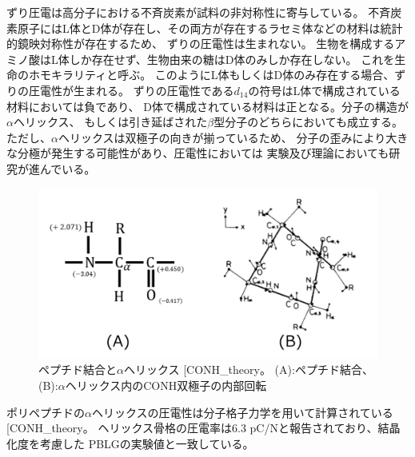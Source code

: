 \documentclass[dvipdfmx,12pt,a4paper]{jreport}
\makeatletter
\DeclareRobustCommand\cite{\unskip
    	\@ifnextchar[{\@tempswatrue\@citex}{\@tempswafalse\@citex[]}}
\makeatother
\begin{document}
			ずり圧電は高分子における不斉炭素が試料の非対称性に寄与している。
			不斉炭素原子にはL体とD体が存在し、その両方が存在するラセミ体などの材料は統計的鏡映対称性が存在するため、
			ずりの圧電性は生まれない。
			生物を構成するアミノ酸はL体しか存在せず、生物由来の糖はD体のみしか存在しない。
			これを生命のホモキラリティと呼ぶ。
			このようにL体もしくはD体のみ存在する場合、ずりの圧電性が生まれる。
			ずりの圧電性である$d_{14}$の符号はL体で構成されている材料においては負であり、
			D体で構成されている材料は正となる。分子の構造が$\alpha$ヘリックス、
			もしくは引き延ばされた$\beta$型分子のどちらにおいても成立する。
			ただし、$\alpha$ヘリックスは双極子の向きが揃っているため、
			分子の歪みにより大きな分極が発生する可能性があり、圧電性においては
			実験及び理論においても研究が進んでいる。
			\begin{figure}[h]
				\centering
				\includegraphics[scale=0.8]{アルファヘリックス_CONH.jpg}
				\caption{ペプチド結合と$\alpha$ヘリックス\cite{CONH_theory}。
				(A):ペプチド結合、(B):$\alpha$ヘリックス内のCONH双極子の内部回転}
				\label{アルファヘリックス}
			\end{figure}
			ポリペプチドの$\alpha$ヘリックスの圧電性は分子格子力学を用いて計算されている\cite{CONH_theory}。
			ヘリックス骨格の圧電率は$6.3$ pC/Nと報告されており、結晶化度を考慮した
			PBLGの実験値と一致している。
			
\end{document}
